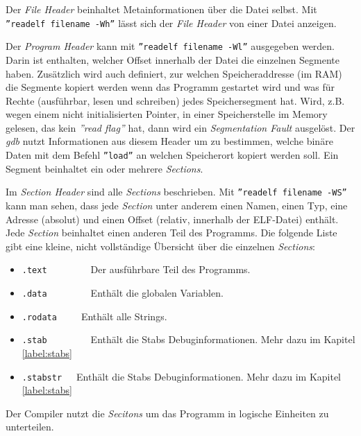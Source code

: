 


Der \textit{File Header} beinhaltet Metainformationen über die Datei selbst.
Mit \texttt{''readelf filename -Wh''} lässt sich der \textit{File Header} von einer Datei anzeigen.

Der \textit{Program Header} kann mit \texttt{''readelf filename -Wl''} ausgegeben werden. Darin ist enthalten, welcher Offset innerhalb der Datei die einzelnen Segmente haben.
Zusätzlich wird auch definiert, zur welchen Speicheraddresse (im RAM) die Segmente kopiert werden wenn das Programm gestartet wird und was für Rechte (ausführbar, lesen und schreiben) jedes Speichersegment hat.
Wird, z.B. wegen einem nicht initialisierten Pointer, in einer Speicherstelle im Memory gelesen, das kein \textit{''read flag''} hat, dann wird ein \textit{Segmentation Fault} ausgelöst.
Der \textit{gdb} nutzt Informationen aus diesem Header um zu bestimmen, welche binäre Daten mit dem Befehl \texttt{''load''} an welchen Speicherort kopiert werden soll.
Ein Segment beinhaltet ein oder mehrere \textit{Sections}.

Im \textit{Section Header} sind alle \textit{Sections} beschrieben.
Mit \texttt{''readelf filename -WS''} kann man sehen, dass jede \textit{Section} unter anderem einen Namen, einen Typ, eine Adresse (absolut) und einen Offset (relativ, innerhalb der ELF-Datei) enthält.
Jede \textit{Section} beinhaltet einen anderen Teil des Programms.
Die folgende Liste gibt eine kleine, nicht vollständige Übersicht über die einzelnen \textit{Sections}:
\begin{itemize}
	\item \texttt{.text}\ \ \ \ \ \ \ \ \ Der ausführbare Teil des Programms.
	\item \texttt{.data}\ \ \ \ \ \ \ \ \ Enthält die globalen Variablen.
	\item \texttt{.rodata}\ \ \ \ \ Enthält alle Strings.
	\item \texttt{.stab}\ \ \ \ \ \ \ \ \ Enthält die Stabs Debuginformationen. Mehr dazu im Kapitel \ref{label:stabs} 
	\item \texttt{.stabstr}\ \ \ Enthält die Stabs Debuginformationen. Mehr dazu im Kapitel \ref{label:stabs} 
\end{itemize}
Der Compiler nutzt die \textit{Secitons} um das Programm in logische Einheiten zu unterteilen.


